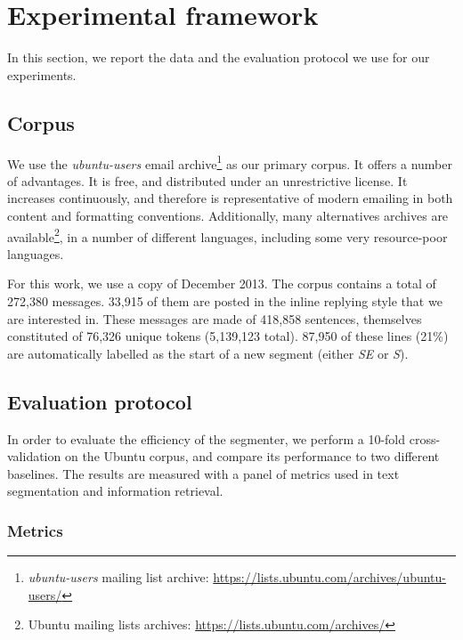 \section{Experimental framework}
\label{sec:experimentalframework}
In this section, we report the data and the evaluation protocol we use for our experiments.
\subsection{Corpus}

We use the \textit{ubuntu-users} email archive\footnote{\textit{ubuntu-users} mailing list archive: \url{https://lists.ubuntu.com/archives/ubuntu-users/}} as our primary corpus. It offers a number of advantages. It is free, and distributed under an unrestrictive license. It increases continuously, and therefore is representative of modern emailing in both content and formatting conventions. Additionally, many alternatives archives are available\footnote{Ubuntu mailing lists archives: \url{https://lists.ubuntu.com/archives/}}, in a number of different languages, including some very resource-poor languages.

For this work, we use a copy of December 2013.
The corpus contains a total of 272,380 messages. 33,915 of them are posted in the inline replying style that we are interested in. These messages are made of 418,858 sentences, themselves constituted of 76,326 unique tokens (5,139,123 total). 87,950 of these lines (21\%) are automatically labelled as the start of a new segment (either \textit{SE} or \textit{S}).
\subsection{Evaluation protocol}

In order to evaluate the efficiency of the segmenter, we perform a 10-fold cross-validation on the Ubuntu corpus, and compare its performance to two different baselines. The results are measured with a panel of metrics used in text segmentation and information retrieval.
\subsubsection{Metrics}

